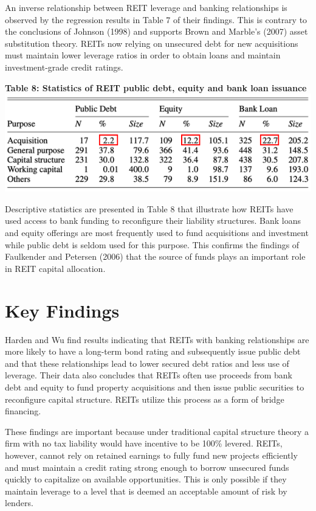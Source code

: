 \documentclass[a4paper, 12pt]{article} %
\begin{document}
An inverse relationship between REIT leverage and banking relationships is observed by the regression results in Table 7 of their findings. This is contrary to the conclusions of Johnson (1998) and supports Brown and Marble's (2007) asset substitution theory. REITs now relying on unsecured debt for new acquisitions must maintain lower leverage ratios in order to obtain loans and maintain investment-grade credit ratings.

\newpage

\begin{center}
\textbf{Table 8: Statistics of REIT public debt, equity and bank loan issuance}
\includegraphics[width=1\textwidth]{Table_VIII.png}

\end{center}

Descriptive statistics are presented in Table 8 that illustrate how REITs have used access to bank funding to reconfigure their liability structures.
Bank loans and equity offerings are most frequently used to fund acquisitions and investment while public debt is seldom used for this purpose. This confirms the findings of Faulkender and Petersen (2006) that the source of funds plays an important role in REIT capital allocation.



\section*{Key Findings}

Harden and Wu find results indicating that REITs with banking relationships are more likely to have a long-term bond rating and subsequently issue public debt and that these relationships lead to lower secured debt ratios and less use of leverage. Their data also concludes that REITs often use proceeds from bank debt and equity to fund property acquisitions and then issue public securities to reconfigure capital structure. REITs utilize this process as a form of bridge financing.

These findings are important because under traditional capital structure theory a firm with no tax liability would have incentive to be 100\% levered. REITs, however, cannot rely on retained earnings to fully fund new projects efficiently and must maintain a credit rating strong enough to borrow unsecured funds quickly to capitalize on available opportunities. This is only possible if they maintain leverage to a level that is deemed an acceptable amount of risk by lenders.
\end{document}
